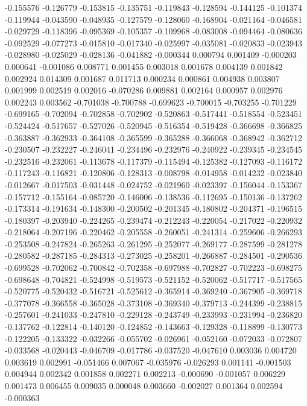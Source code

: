 -0.155576
-0.126779
-0.153815
-0.135751
-0.119843
-0.128594
-0.144125
-0.101374
-0.119944
-0.043590
-0.048935
-0.127579
-0.128060
-0.168904
-0.021164
-0.046581
-0.029729
-0.118396
-0.095369
-0.105357
-0.109968
-0.083008
-0.094464
-0.080636
-0.092529
-0.077273
-0.015810
-0.017340
-0.025997
-0.035081
-0.020833
-0.023943
-0.028980
-0.025029
-0.028136
-0.041882
-0.000344
0.000794
0.001409
-0.000203
0.000641
-0.001086
0.008771
0.001455
0.003018
0.001678
0.004139
0.001842
0.002924
0.014309
0.001687
0.011713
0.000234
0.000861
0.004938
0.003807
0.001999
0.002519
0.002016
-0.070286
0.009881
0.002164
0.000957
0.002976
0.002243
0.003562
-0.701038
-0.700788
-0.699623
-0.700015
-0.703255
-0.701229
-0.699165
-0.702094
-0.702858
-0.702902
-0.520863
-0.517441
-0.518554
-0.523451
-0.524424
-0.517657
-0.527026
-0.520945
-0.516354
-0.519428
-0.366698
-0.366825
-0.363887
-0.362933
-0.364108
-0.365599
-0.365288
-0.366068
-0.368942
-0.362712
-0.230507
-0.232227
-0.246041
-0.234496
-0.232976
-0.240922
-0.239345
-0.234545
-0.232516
-0.232061
-0.113678
-0.117379
-0.115494
-0.125382
-0.127093
-0.116172
-0.117243
-0.116821
-0.120806
-0.128313
-0.008798
-0.014958
-0.014232
-0.023840
-0.012667
-0.017503
-0.031448
-0.024752
-0.021960
-0.023397
-0.156044
-0.153367
-0.157712
-0.155164
-0.085720
-0.146006
-0.138536
-0.112695
-0.150136
-0.137262
-0.173314
-0.191634
-0.148300
-0.200502
-0.201345
-0.180802
-0.204371
-0.196515
-0.180397
-0.203940
-0.224265
-0.239474
-0.212243
-0.220054
-0.217022
-0.220932
-0.218064
-0.207196
-0.220462
-0.205558
-0.260051
-0.241314
-0.259606
-0.266293
-0.253508
-0.247824
-0.265263
-0.261295
-0.252077
-0.269177
-0.287599
-0.281278
-0.280582
-0.287185
-0.284313
-0.273025
-0.258201
-0.266887
-0.284501
-0.290536
-0.699528
-0.702062
-0.700842
-0.702358
-0.697988
-0.702827
-0.702223
-0.698275
-0.698648
-0.704821
-0.524998
-0.519573
-0.521152
-0.520062
-0.517717
-0.517565
-0.520775
-0.520432
-0.516721
-0.525612
-0.365914
-0.369240
-0.367905
-0.369718
-0.377078
-0.366558
-0.365028
-0.373108
-0.369340
-0.379713
-0.244399
-0.238815
-0.257601
-0.241033
-0.247810
-0.229128
-0.243749
-0.233993
-0.231994
-0.236820
-0.137762
-0.122814
-0.140120
-0.124852
-0.143663
-0.129328
-0.118899
-0.130773
-0.122205
-0.133322
-0.032266
-0.055702
-0.026961
-0.052160
-0.072033
-0.072807
-0.033568
-0.020443
-0.046709
-0.017786
-0.037520
-0.047610
0.003036
0.004720
0.003619
0.002991
-0.051466
0.007067
-0.035976
-0.026293
0.001141
-0.001503
0.004944
0.002342
0.001858
0.002271
0.002213
-0.000690
-0.001057
0.006229
0.001473
0.006455
0.009035
0.000048
0.003660
-0.002027
0.001364
0.002594
-0.000363
